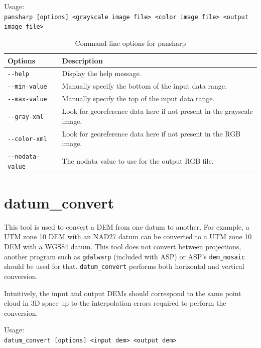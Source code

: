 \medskip

Usage:\\
\hspace*{2em}\texttt{pansharp [options] <grayscale image file> <color image file> <output image file>}

\medskip

\begin{longtable}{|l|p{10cm}|}
\caption{Command-line options for pansharp}
\label{tbl:pansharp}
\endfirsthead
\endhead
\endfoot
\endlastfoot
\hline
Options & Description \\ \hline \hline
\texttt{-\/-help} & Display the help message.\\ \hline
\texttt{-\/-min-value} & Manually specify the bottom of the input data range.\\ \hline
\texttt{-\/-max-value} & Manually specify the top of the input data range.\\ \hline
\texttt{-\/-gray-xml} & Look for georeference data here if not present in the grayscale image.\\ \hline
\texttt{-\/-color-xml} & Look for georeference data here if not present in the RGB image.\\ \hline
\texttt{-\/-nodata-value} & The nodata value to use for the output RGB file.\\ \hline
\end{longtable}

\section{datum\_convert}
\label{datumconvert}

This tool is used to convert a DEM from one datum to another.  For
example, a UTM zone 10 DEM with an NAD27 datum can be converted to a UTM
zone 10 DEM with a WGS84 datum.  This tool does not convert between
projections, another program such as \texttt{gdalwarp} (included with ASP) or
ASP's \texttt{dem\_mosaic} should be used for that. \texttt{datum\_convert} performs both
horizontal and vertical conversion.

Intuitively, the input and output DEMs should correspond to the same
point cloud in 3D space up to the interpolation errors required to
perform the conversion.

\medskip
Usage:\\
\hspace*{2em}\texttt{datum\_convert [options] <input dem> <output dem>}
\medskip

